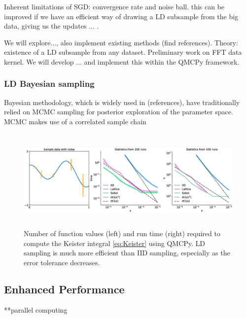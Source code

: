 \documentclass[11pt]{NSFamsart}
\begin{document}
Inherent limitations of SGD: convergence rate and noise ball. this can be improved if we have an efficient way of drawing a LD subsample from the big data, giving us the updates ... .

We will explore..., also implement existing methods (find references). Theory: existence of a LD subsample from any dataset. Preliminary work on FFT data kernel. We will develop ... and implement this within the QMCPy framework.

\subsubsection{LD Bayesian sampling}

Bayesian methodology, which is widely used in (references), have traditionally relied on MCMC sampling for posterior exploration of the parameter space. MCMC makes use of a correlated sample chain 

\begin{figure}[H]
	\centering
	\includegraphics[height = 5cm]{ProgramsImages/qEI_cost_comp_time.eps}
	\caption{Number of function values (left) and run time (right) required to compute the Keister integral \eqref{eq:Keister} using QMCPy.  LD sampling is much more efficient than IID sampling, especially as the error tolerance decreases.}
	\label{fig:qei}
\end{figure}



\subsection{Enhanced Performance}
**parallel computing
\end{document}

